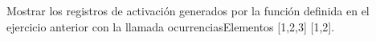 Mostrar los registros de activación generados por la 
función definida en el ejercicio anterior con la llamada 
ocurrenciasElementos [1,2,3] [1,2].